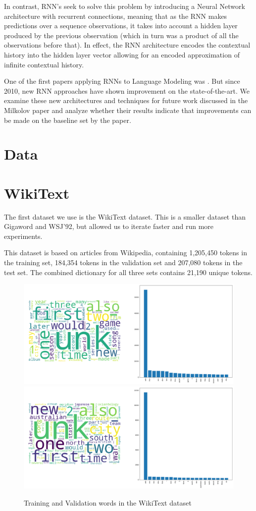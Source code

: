 \documentclass[a4paper]{article}
\begin{document}
In contrast, RNN's seek to solve this problem by introducing a Neural Network
architecture with recurrent connections, meaning that as the RNN makes predictions
over a sequence observations, it takes into account a hidden layer produced
by the previous observation (which in turn was a product of all the observations
before that). In effect, the RNN architecture encodes the contextual history
into the hidden layer vector allowing for an encoded approximation of infinite
contextual history.

One of the first papers applying RNNs to Language Modeling was \cite{Milkolov10}. But since 2010, new RNN approaches have shown
improvement on the state-of-the-art. We examine these new architectures and
techniques for future work discussed in the Milkolov paper and analyze whether their
results indicate that improvements can be made on the baseline set by the paper.

\section{Data}
\label{sec:data}

\section{WikiText}
\label{sec:wikitext}

The first dataset we use is the WikiText dataset. This is a smaller dataset than
Gigaword and WSJ'92, but allowed us to
iterate faster and run more experiments.

This dataset is based on articles from Wikipedia, containing 1,205,450 tokens in
the training set, 184,354 tokens in the validation set and 207,080 tokens
in the test set. The combined dictionary for all three sets contains 21,190
unique tokens.

\begin{figure}[!ht]
\includegraphics[width=0.7\columnwidth]{sr-eda-wikitext-train-words}
\includegraphics[width=0.7\columnwidth]{sr-eda-wikitext-valid-words}
\centering
\caption{Training and Validation words in the WikiText dataset}
\end{figure}
\end{document}
